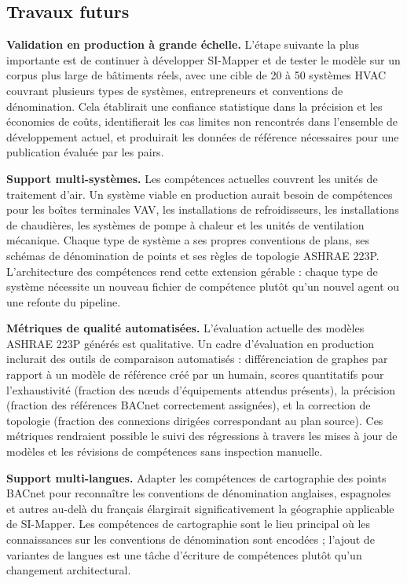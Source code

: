 \subsection{Travaux futurs}
\label{subsec:future-work}

\textbf{Validation en production à grande échelle.}
L'étape suivante la plus importante est de continuer à développer SI-Mapper et de tester le modèle sur
un corpus plus large de bâtiments réels, avec une cible de 20 à 50 systèmes HVAC couvrant plusieurs types
de systèmes, entrepreneurs et conventions de dénomination.
Cela établirait une confiance statistique dans la précision et les économies de coûts, identifierait les
cas limites non rencontrés dans l'ensemble de développement actuel, et produirait les données de
référence nécessaires pour une publication évaluée par les pairs.

\textbf{Support multi-systèmes.}
Les compétences actuelles couvrent les unités de traitement d'air.
Un système viable en production aurait besoin de compétences pour les boîtes terminales VAV, les
installations de refroidisseurs, les installations de chaudières, les systèmes de pompe à chaleur et
les unités de ventilation mécanique.
Chaque type de système a ses propres conventions de plans, ses schémas de dénomination de points et ses
règles de topologie ASHRAE 223P.
L'architecture des compétences rend cette extension gérable : chaque type de système nécessite un nouveau
fichier de compétence plutôt qu'un nouvel agent ou une refonte du pipeline.

\textbf{Métriques de qualité automatisées.}
L'évaluation actuelle des modèles ASHRAE 223P générés est qualitative.
Un cadre d'évaluation en production inclurait des outils de comparaison automatisés : différenciation de
graphes par rapport à un modèle de référence créé par un humain, scores quantitatifs pour l'exhaustivité
(fraction des nœuds d'équipements attendus présents), la précision (fraction des références BACnet
correctement assignées), et la correction de topologie (fraction des connexions dirigées correspondant
au plan source).
Ces métriques rendraient possible le suivi des régressions à travers les mises à jour de modèles et
les révisions de compétences sans inspection manuelle.

\textbf{Support multi-langues.}
Adapter les compétences de cartographie des points BACnet pour reconnaître les conventions de dénomination
anglaises, espagnoles et autres au-delà du français élargirait significativement la géographie applicable
de SI-Mapper.
Les compétences de cartographie sont le lieu principal où les connaissances sur les conventions de
dénomination sont encodées ; l'ajout de variantes de langues est une tâche d'écriture de compétences
plutôt qu'un changement architectural.

